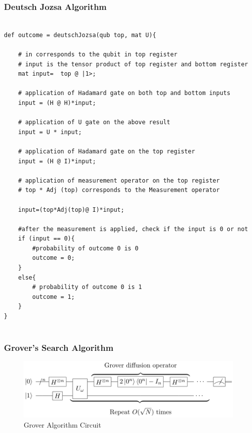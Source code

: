 \subsubsection{Deutsch Jozsa Algorithm}
\begin{lstlisting}

def outcome = deutschJozsa(qub top, mat U){
		
	# in corresponds to the qubit in top register
	# input is the tensor product of top register and bottom register
	mat input=  top @ |1>;
		
	# application of Hadamard gate on both top and bottom inputs
	input = (H @ H)*input;
		
	# application of U gate on the above result
	input = U * input;
		
	# application of Hadamard gate on the top register
	input = (H @ I)*input;
		
	# application of measurement operator on the top register
	# top * Adj (top) corresponds to the Measurement operator
		
	input=(top*Adj(top)@ I)*input;
		
	#after the measurement is applied, check if the input is 0 or not
	if (input == 0){
		#probability of outcome 0 is 0
		outcome = 0;
	}
	else{
		# probability of outcome 0 is 1
		outcome = 1;
	}
}
	
\end{lstlisting}

\subsubsection {Grover's Search Algorithm}

\begin{figure}[h!]
\begin{center}
\includegraphics{ref/grover}
\end{center}
\caption{ Grover Algorithm Circuit 
\label{fig:grover}}
\end{figure}

